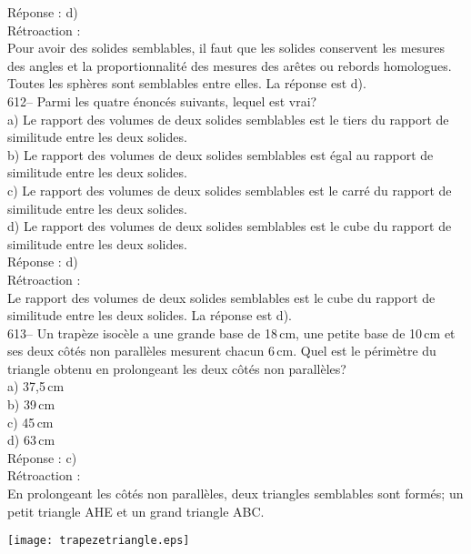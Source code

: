 ﻿\documentclass[letterpaper, 12pt]{article}
\begin{document}
R\'eponse : d)\\

R\'etroaction : \\
Pour avoir des solides semblables, il faut que les solides conservent les
mesures des angles et la proportionnalit\'e des mesures des ar\^etes ou
rebords homologues.  Toutes les sph\`eres sont semblables entre elles.  La
r\'eponse est d).\\


612-- Parmi les quatre \'enonc\'es suivants, lequel est vrai?\\
a) Le rapport des volumes de deux solides semblables est le tiers du rapport
de similitude entre les deux solides.\\
b) Le rapport des volumes de deux solides semblables est \'egal au rapport
de similitude entre les deux solides.\\
c) Le rapport des volumes de deux solides semblables est le carr\'e du
rapport de similitude entre les deux solides.\\
d) Le rapport des volumes de deux solides semblables est le cube du rapport
de similitude entre les deux solides.\\

R\'eponse : d)\\

R\'etroaction : \\
Le rapport des volumes de deux solides semblables est le cube du rapport de
similitude entre les deux solides.  La r\'eponse est d).\\

613-- Un trap\`eze isoc\`ele a une grande base de 18\,cm, une petite base de
10\,cm et ses deux c\^ot\'es non parall\`eles mesurent chacun 6\,cm.  Quel
est le p\'erim\`etre du triangle obtenu en prolongeant les deux c\^ot\'es
non parall\`eles?\\
a) 37,5\,cm\\
b) 39\,cm\\
c) 45\,cm\\
d) 63\,cm\\

R\'eponse : c)\\

R\'etroaction : \\
En prolongeant les c\^ot\'es non parall\`eles, deux triangles semblables
sont form\'es; un petit triangle AHE et un grand triangle ABC.\\
    \begin{center}
    \texttt{[image: trapezetriangle.eps]}
    \end{center}
\end{document}
